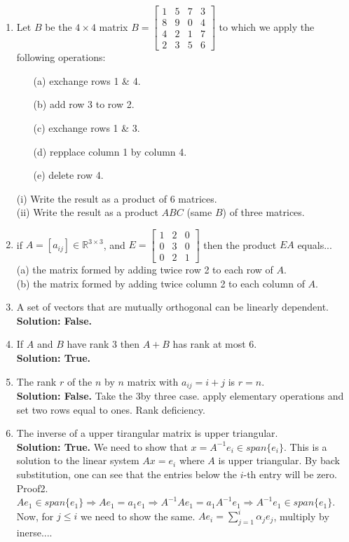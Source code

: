 \documentclass[14pt]{report}
\begin{document}
\begin{enumerate}
\item Let $B$ be the $4\times4$ matrix $B=\left[\begin{array}{cccc}
  1&5&7&3\\8&9&0&4\\4&2&1&7\\2&3&5&6\end{array}\right]$ to which we apply the following operations:
        \begin{enumerate}
          \item[(a)] exchange rows 1 \& 4.
          \item[(b)] add row 3 to row 2.
          \item[(c)] exchange rows 1 \& 3.
          \item[(d)] repplace column 1 by column 4.
          \item[(e)] delete row 4.  
        \end{enumerate}
(i) Write the result as a product of 6 matrices.\\
(ii) Write the result as a product $ABC$ (same $B$) of three matrices.

\item if $A=[a_{ij}]\in\mathbb{R}^{3\times 3}$, and $E=\left[\begin{array}{ccc}
  1&2&0\\0&3&0\\0&2&1\end{array}\right]$ then the product $EA$ equals...\\
      (a) the matrix formed by adding twice row 2 to each row of $A$.\\
      (b) the matrix formed by adding twice column 2 to each column of $A$.

\item A set of vectors that are mutually orthogonal can be
  linearly dependent. \\
  \textbf{Solution: False.} 

\item If $A$ and $B$ have rank $3$ then $A+B$ has rank at most $6$.\\
  \textbf{Solution: True.} 

\item The rank $r$ of the $n$ by $n$ matrix with $a_{ij}=i+j$ is $r=n$.\\
\textbf{Solution: False.} Take the 3by three case. apply elementary operations
and set two rows equal to ones. Rank deficiency. 

\item The inverse of a upper tirangular matrix is upper triangular.\\
  \textbf{Solution: True.} We need to show that $x=A^{-1}e_i\in
  span\{e_i\}$. This is a solution to the linear system
  $Ax=e_i$ where $A$ is upper triangular. By back
  substitution, one can see that the entries below the $i$-th
  entry will be zero. Proof2. $Ae_1\in span\{e_1\}\Rightarrow
  Ae_1=a_1e_1\Rightarrow A^{-1}Ae_1=a_1A^{-1}e_1\Rightarrow A^{-1}e_1\in
  span\{e_1\}$. Now, for $j\leq i$ we need to show the same.
  $Ae_i=\sum_{j=1}^{i}\alpha_je_j$, multiply by inerse....


\end{enumerate}
\end{document}
